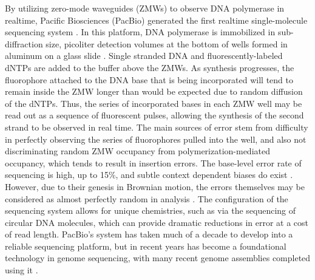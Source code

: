By utilizing zero-mode waveguides (ZMWs) to observe DNA polymerase in realtime, Pacific Biosciences (PacBio) generated the first realtime single-molecule sequencing system \cite{eid2008real}.
In this platform, DNA polymerase is immobilized in sub-diffraction size, picoliter detection volumes at the bottom of wells formed in aluminum on a glass slide \cite{korlach2008selective}.
Single stranded DNA and fluorescently-labeled dNTPs are added to the buffer above the ZMWs.
As synthesis progresses, the fluorophore attached to the DNA base that is being incorporated will tend to remain inside the ZMW longer than would be expected due to random diffusion of the dNTPs.
Thus, the series of incorporated bases in each ZMW well may be read out as a sequence of fluorescent pulses, allowing the synthesis of the second strand to be observed in real time.
The main sources of error stem from difficulty in perfectly observing the series of fluorophores pulled into the well, and also not discriminating random ZMW occupancy from polymerization-mediated occupancy, which tends to result in insertion errors.
The base-level error rate of sequencing is high, up to 15\%, and subtle context dependent biases do exist \cite{ono2012pbsim}.
However, due to their genesis in Brownian motion, the errors themselves may be considered as almost perfectly random in analysis \cite{ross2013characterizing,myers2014efficient}.
The configuration of the sequencing system allows for unique chemistries, such as via the sequencing of circular DNA molecules, which can provide dramatic reductions in error at a cost of read length.
PacBio's system has taken much of a decade to develop into a reliable sequencing platform, but in recent years has become a foundational technology in genome sequencing, with many recent genome assemblies completed using it \cite{rhoads2015pacbio}.

